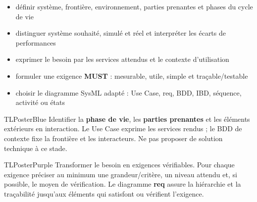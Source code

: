 \documentclass[10pt,a3paper]{article}
\begin{document}
\vspace{2mm}
\begin{minipage}[t]{0.61\linewidth}
\begin{TLPosterSavoirs}
\begin{itemize}
  \item définir système, frontière, environnement, parties prenantes et phases du cycle de vie
  \item distinguer système souhaité, simulé et réel et interpréter les écarts de performances
  \item exprimer le besoin par les services attendus et le contexte d'utilisation
  \item formuler une exigence \textbf{MUST} : mesurable, utile, simple et traçable/testable
  \item choisir le diagramme SysML adapté : Use Case, req, BDD, IBD, séquence, activité ou états
\end{itemize}
\end{TLPosterSavoirs}
\end{minipage}\hfill
\begin{minipage}[t]{0.36\linewidth}
\end{minipage}
\vfill
\begin{minipage}[t]{0.49\linewidth}
\begin{TLPosterBloc}{TLPosterBlue}
Identifier la \textbf{phase de vie}, les \textbf{parties prenantes} et les éléments extérieurs en interaction. Le Use Case exprime les services rendus ; le BDD de contexte fixe la frontière et les interacteurs. Ne pas proposer de solution technique à ce stade.
\end{TLPosterBloc}
\begin{TLPosterBloc}{TLPosterPurple}
Transformer le besoin en exigences vérifiables. Pour chaque exigence préciser au minimum une grandeur/critère, un niveau attendu et, si possible, le moyen de vérification. Le diagramme \textbf{req} assure la hiérarchie et la traçabilité jusqu'aux éléments qui satisfont ou vérifient l'exigence.
\end{TLPosterBloc}
\end{minipage}\hfill
\end{document}
